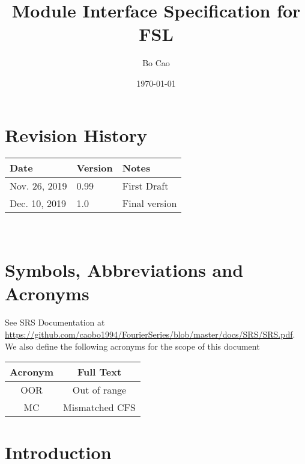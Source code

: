 \documentclass[12pt, titlepage]{article}
\begin{document}
\title{Module Interface Specification for FSL}

\author{Bo Cao}

\date{\today}

\maketitle



\section{Revision History}

\begin{tabularx}{\textwidth}{p{3cm}p{2cm}X}
\toprule {\bf Date} & {\bf Version} & {\bf Notes}\\
\midrule
Nov. 26, 2019 & 0.99 & First Draft\\
Dec. 10, 2019 & 1.0 & Final version\\
\bottomrule
\end{tabularx}

~\newpage

\section{Symbols, Abbreviations and Acronyms}

See SRS Documentation at \url{https://github.com/caobo1994/FourierSeries/blob/master/docs/SRS/SRS.pdf}.
We also define the following acronyms for the scope of this document
\begin{center}
	
\begin{tabular}{c c}
	\hline
	\textbf{Acronym} & \textbf{Full Text}\\
	\hline
	OOR & Out of range\\
	MC & Mismatched CFS\\
	\hline
\end{tabular}
\end{center}
\newpage

\tableofcontents

\newpage


\section{Introduction}
\end{document}
